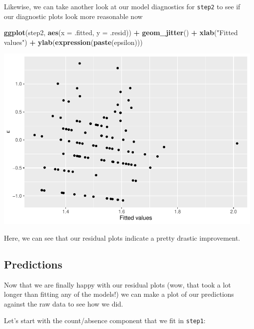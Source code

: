 \documentclass[
]{book}
\newenvironment{Shaded}{\begin{snugshade}}{\end{snugshade}}
\newcommand{\DataTypeTok}[1]{\textcolor[rgb]{0.13,0.29,0.53}{#1}}
\newcommand{\KeywordTok}[1]{\textcolor[rgb]{0.13,0.29,0.53}{\textbf{#1}}}
\newcommand{\NormalTok}[1]{#1}
\newcommand{\OperatorTok}[1]{\textcolor[rgb]{0.81,0.36,0.00}{\textbf{#1}}}
\newcommand{\StringTok}[1]{\textcolor[rgb]{0.31,0.60,0.02}{#1}}
\begin{document}
Likewise, we can take another look at our model diagnostics for \texttt{step2} to see if our diagnostic plots look more reasonable now

\begin{Shaded}
\begin{Highlighting}[]
\KeywordTok{ggplot}\NormalTok{(step2, }\KeywordTok{aes}\NormalTok{(}\DataTypeTok{x =}\NormalTok{ .fitted, }\DataTypeTok{y =}\NormalTok{ .resid)) }\OperatorTok{+}
\StringTok{  }\KeywordTok{geom_jitter}\NormalTok{() }\OperatorTok{+}
\StringTok{  }\KeywordTok{xlab}\NormalTok{(}\StringTok{"Fitted values"}\NormalTok{) }\OperatorTok{+}
\StringTok{  }\KeywordTok{ylab}\NormalTok{(}\KeywordTok{expression}\NormalTok{(}\KeywordTok{paste}\NormalTok{(epsilon)))}
\end{Highlighting}
\end{Shaded}

\includegraphics{worstr_files/figure-latex/unnamed-chunk-362-1.pdf}

Here, we can see that our residual plots indicate a pretty drastic improvement.

\hypertarget{predictions}{%
\subsection{Predictions}\label{predictions}}

Now that we are finally happy with our residual plots (wow, that took a lot longer than fitting any of the models!) we can make a plot of our predictions against the raw data to see how we did.

Let's start with the count/absence component that we fit in \texttt{step1}:
\end{document}
